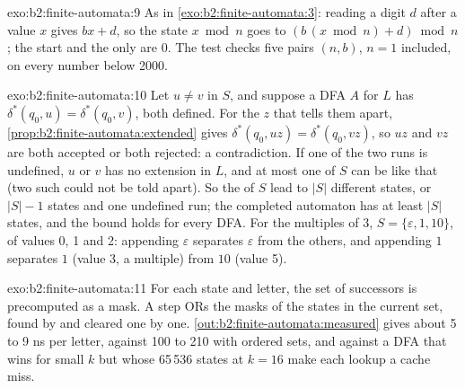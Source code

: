 \begin{solution}{exo:b2:finite-automata:9}
As in \cref{exo:b2:finite-automata:3}: reading a digit $d$ after a value $x$ gives $bx + d$, so the state $x \bmod n$
goes to $(b\,(x \bmod n) + d) \bmod n$; the start and the only  are 0. The test checks five pairs
$(n, b)$, $n = 1$ included, on every number below 2000.
\end{solution}

\begin{solution}{exo:b2:finite-automata:10}
Let $u \ne v$ in $S$, and suppose a DFA $A$ for $L$ has $\delta^*(q_0, u) = \delta^*(q_0, v)$, both defined. For the
 $z$ that tells them apart, \cref{prop:b2:finite-automata:extended} gives $\delta^*(q_0, uz) = \delta^*(q_0,
vz)$, so $uz$ and $vz$ are both accepted or both rejected: a contradiction. If one of the two runs is undefined, $u$ or
$v$ has no extension in $L$, and at most one  of $S$ can be like that (two such  could not be told apart). So
the  of $S$ lead to $|S|$ different states, or $|S| - 1$ states and one undefined run; the completed automaton has
at least $|S|$ states, and the bound holds for every  DFA. For the multiples of 3, $S = \{\varepsilon, 1, 10\}$,
of values 0, 1 and 2: appending $\varepsilon$ separates $\varepsilon$ from the others, and appending $1$ separates $1$
(value 3, a multiple) from $10$ (value 5).
\end{solution}

\begin{solution}{exo:b2:finite-automata:11}
For each state and letter, the set of successors is precomputed as a mask. A step ORs the masks of the states in the
current set, found by  and cleared one by one. \cref{out:b2:finite-automata:measured} gives about
5 to 9 ns per letter, against 100 to 210 with ordered sets, and against a DFA that wins for small $k$ but whose 65\,536
states at $k = 16$ make each lookup a cache miss.
\end{solution}

